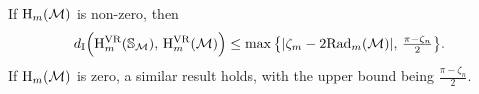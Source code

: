 



\subsubsection{}\label{sss:db_upper_bound}

\lemma
If \( \operatorname{H}_m(\mathcal{M}) \) is non-zero, then
\begin{equation}\label{eq:db_usual_upper_bound}
    d_{\mathrm{I}}\Big(\mathrm{H}^{\mathrm{VR}}_{m}(\mathbb{S}_{\mathcal{M}}),\, \mathrm{H}^{\mathrm{VR}}_{m}(\mathcal{M})\Big)
	\leq \max\big\{|\zeta_m  - 2\mathrm{Rad}_{m}(\mathcal{M}) |,\, \tfrac{\pi - \zeta_n}{2}\big\}.
\end{equation}
If \( \operatorname{H}_m(\mathcal{M}) \) is zero, a similar result holds, with the upper bound being $\tfrac{\pi - \zeta_n}{2}$.

